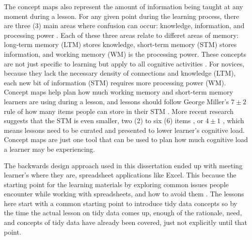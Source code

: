 \documentclass[010-intro.tex]{subfiles}
\begin{document}
        The concept maps also represent the amount of information being taught at any moment during a lesson.
        For any given point during the learning process,
        there are three (3) main areas where confusion can occur:
        knowledge, information, and processing power \cite{hermansProgrammerBrain2021}.
        Each of these three areas relate to differet areas of memory:
        long-term memory (LTM) stores knowledge,
        short-term memory (STM) stores information, and
        working memory (WM) is the processing power.
        These concepts are not just specific to learning but apply to all cognitive activities
        \cite{hermansProgrammerBrain2021}.
        For novices, because they lack the necessary density of connections and knowledge (LTM),
        each new bit of information (STM) requires more processing power (WM).
        Concept maps help plan how much working memory and short-term memory learners are using during a lesson,
        and lessons should follow George Miller's $7\pm2$ rule of how many items people can store in their STM
        \cite{miller1956magical}.
        More recent research suggests that the STM is even smaller, two (2) to six (6) items
        \cite{hermansProgrammerBrain2021},
        or $4\pm1$ \cite{didauWhatEveryTeacher2016},
        which means lessons need to be curated and presented to lower learner's cognitive load.
        Concept maps are just one tool that can be used to plan how much cognitive load a learner may be experiencing.

        The backwards design approach used in this dissertation ended up with meeting learner's where they are,
        spreadsheet applications like Excel.
        This because the starting point for the learning materials by exploring common issues people encounter while
        working with spreadsheets, and how to avoid them
        \cite{bromanDataOrganizationSpreadsheets2018}.
        The lessons here start with a common starting point to introduce tidy data concepts so by
        the time the actual lesson on tidy data comes up,
        enough of the rationale, need, and concepts of tidy data have already been covered,
        just not explicitly until that point.
\end{document}
